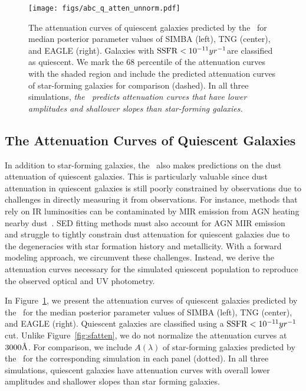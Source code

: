 \begin{figure}
\begin{center}
    \texttt{[image: figs/abc\_q\_atten\_unnorm.pdf]}
    \caption{\label{fig:q_raw_atten}
    The attenuation curves of quiescent galaxies predicted by the \eda~for
    median posterior parameter values of SIMBA (left), TNG (center), and
    EAGLE (right).
    Galaxies with ${\rm SSFR} < 10^{-11}yr^{-1}$are classified as quiescent.
    We mark the 68 percentile of the attenuation curves with the shaded region
    and include the predicted attenuation curves of star-forming galaxies for
    comparison (dashed). 
    In all three simulations, \emph{the \eda~predicts attenuation curves that
    have lower amplitudes and shallower slopes than star-forming galaxies.}
    }
\end{center}
\end{figure}
\subsection{The Attenuation Curves of Quiescent Galaxies}  
In addition to star-forming galaxies, the \eda~also makes predictions on the
dust attenuation of quiescent galaxies. 
This is particularly valuable since dust attenuation in quiescent galaxies is
still poorly constrained by observations due to challenges in directly
measuring it from observations. 
For instance, methods that rely on IR luminosities can be contaminated by MIR
emission from AGN heating nearby dust~\citep{kirkpatrick2015}. 
SED fitting methods must also account for AGN MIR
emission~\citep{salim2016, leja2018, salim2018} and struggle to tightly
constrain dust attenuation for quiescent galaxies due to the degeneracies
with star formation history and metallicity.
With a forward modeling approach, we circumvent these challenges. 
Instead, we derive the attenuation curves necessary for the simulated quiescent
population to reproduce the observed optical and UV photometry. 

In Figure~\ref{fig:q_raw_atten}, we present the attenuation curves of
quiescent galaxies predicted by the \eda~for the median posterior parameter
values of SIMBA (left), TNG (center), and EAGLE (right). 
Quiescent galaxies are classified using a ${\rm SSFR} < 10^{-11}{yr}^{-1}$ cut. 
Unlike Figure~\ref{fig:sfatten}, we do not normalize the attenuation curves at
$3000\AA$.  
For comparison, we include $A(\lambda)$ of star-forming galaxies predicted
by the \eda~for the corresponding simulation in each panel (dotted).
In all three simulations, quiescent galaxies have attenuation curves with
overall lower amplitudes and shallower slopes than star forming galaxies.

